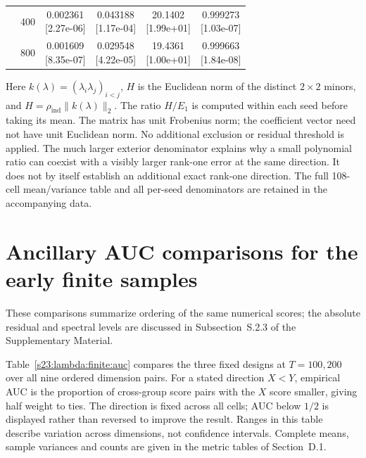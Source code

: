 \documentclass[12pt,letterpaper]{article}
\theoremstyle{plain}
\theoremstyle{definition}
\begin{document}
\begin{table}[p]
\begin{adjustbox}{max width=\linewidth}
\begin{tabular}{lrcccc}
 & 400 & \shortstack{0.002361\\[-1pt]{\scriptsize[2.27e-06]}} & \shortstack{0.043188\\[-1pt]{\scriptsize[1.17e-04]}} & \shortstack{20.1402\\[-1pt]{\scriptsize[1.99e+01]}} & \shortstack{0.999273\\[-1pt]{\scriptsize[1.03e-07]}}\\
 & 800 & \shortstack{0.001609\\[-1pt]{\scriptsize[8.35e-07]}} & \shortstack{0.029548\\[-1pt]{\scriptsize[4.22e-05]}} & \shortstack{19.4361\\[-1pt]{\scriptsize[1.00e+01]}} & \shortstack{0.999663\\[-1pt]{\scriptsize[1.84e-08]}}\\
\bottomrule
\end{tabular}
\end{adjustbox}
\par\smallskip
\begin{minipage}{0.98\linewidth}\footnotesize
Here $k(\lambda)=(\lambda_i\lambda_j)_{i<j}$, $H$ is the Euclidean norm of the distinct $2\times2$ minors, and $H=\rho_{\mathrm{ind}}\|k(\lambda)\|_2$. The ratio $H/E_1$ is computed within each seed before taking its mean. The matrix has unit Frobenius norm; the coefficient vector need not have unit Euclidean norm. No additional exclusion or residual threshold is applied. The much larger exterior denominator explains why a small polynomial ratio can coexist with a visibly larger rank-one error at the same direction. It does not by itself establish an additional exact rank-one direction. The full 108-cell mean/variance table and all per-seed denominators are retained in the accompanying data.
\end{minipage}
\endgroup
\end{table}
\clearpage
\FloatBarrier
\clearpage
\clearpage
\section{Ancillary AUC comparisons for the early finite samples}
\label{s23:lambda:data:auc}
These comparisons summarize ordering of the same numerical scores;
the absolute residual and spectral levels are discussed in
Subsection~S.2.3 of the Supplementary Material.

Table~\ref{s23:lambda:finite:auc} compares the three fixed designs
at $T=100,200$ over all nine ordered dimension pairs.
For a stated direction $X<Y$, empirical AUC is the proportion of
cross-group score pairs with the $X$ score smaller, giving half
weight to ties. The direction is fixed across all cells; AUC below
$1/2$ is displayed rather than reversed to improve the result.
Ranges in this table describe variation across dimensions, not
confidence intervals. Complete means, sample variances and counts are given in the
metric tables of Section~D.1.
\end{document}
